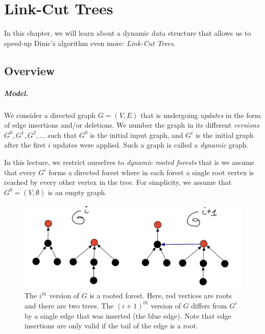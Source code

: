 \chapter{Link-Cut Trees}

In this chapter, we will learn about a dynamic data structure that allows us to speed-up Dinic's algorithm even more: \emph{Link-Cut Trees}.

\section{Overview}

\paragraph{Model.} We consider a directed graph $G=(V,E)$ that is undergoing \emph{updates} in the form of edge insertions and/or deletions. We number the graph in its different \emph{versions} $G^0, G^1, G^2, \dots$ such that $G^0$ is the initial input graph, and $G^i$ is the initial graph after the first $i$ updates were applied. Such a graph is called a \emph{dynamic} graph.

In this lecture, we restrict ourselves to \emph{dynamic rooted forests} that is we assume that every $G^i$ forms a directed forest where in each forest a single root vertex is reached by every other vertex in the tree. For simplicity, we assume that $G^0 = (V, \emptyset)$ is an empty graph.

\begin{figure}[!ht]
    \centering
    \includegraphics[scale=0.2]{./fig/InsertionDynamicTree_lectureDynamicTree.jpeg}
    \caption{The $i^{th}$ version of $G$ is a rooted forest. Here, red vertices are roots and there are two trees. The $(i+1)^{th}$ version of $G$ differs from $G^i$ by a single edge that was inserted (the blue edge). Note that edge insertions are only valid if the tail of the edge is a root.}
    \label{fig:my_label}
\end{figure}

